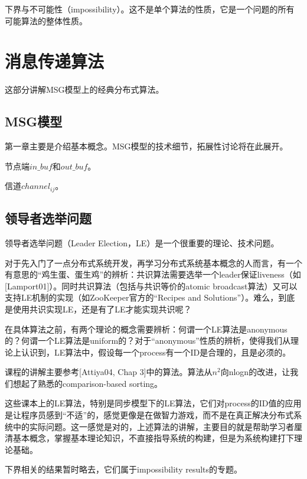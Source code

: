 \documentclass[UTF8]{ctexrep}
\begin{document}
下界与不可能性（impossibility）。这不是单个算法的性质，它是一个问题的所有可能算法的整体性质。

\part{消息传递算法} 

这部分讲解MSG模型上的经典分布式算法。


\chapter{MSG模型} \label{Chap_MSG}

第一章主要是介绍基本概念。MSG模型的技术细节，拓展性讨论将在此展开。

节点端$in\_buf$和$out\_buf$。

信道$channel_{ij}$。


\chapter{领导者选举问题}

领导者选举问题（Leader Election，LE）是一个很重要的理论、技术问题。

对于先入门了一点分布式系统开发，再学习分布式系统基本概念的人而言，有一个有意思的“鸡生蛋、蛋生鸡”的辨析：共识算法需要选举一个leader保证liveness（如[Lamport01]）。同时共识算法（包括与共识等价的atomic broadcast算法）又可以支持LE机制的实现（如ZooKeeper官方的“Recipes and Solutions”）。难么，到底是使用共识实现LE，还是有了LE才能实现共识呢？

在具体算法之前，有两个理论的概念需要辨析：何谓一个LE算法是anonymous的？何谓一个LE算法是uniform的？对于“anonymous”性质的辨析，使得我们从理论上认识到，LE算法中，假设每一个process有一个ID是合理的，且是必须的。

课程的讲解主要参考[Attiya04, Chap 3]中的算法。算法从$n^2$向nlogn的改进，让我们想起了熟悉的comparison-based sorting。

这些课本上的LE算法，特别是同步模型下的LE算法，它们对process的ID值的应用是让程序员感到“不适”的，感觉更像是在做智力游戏，而不是在真正解决分布式系统中的实际问题。这一感觉是对的，上述算法的讲解，主要目的就是帮助学习者厘清基本概念，掌握基本理论知识，不直接指导系统的构建，但是为系统构建打下理论基础。

下界相关的结果暂时略去，它们属于impossibility results的专题。
\end{document}
